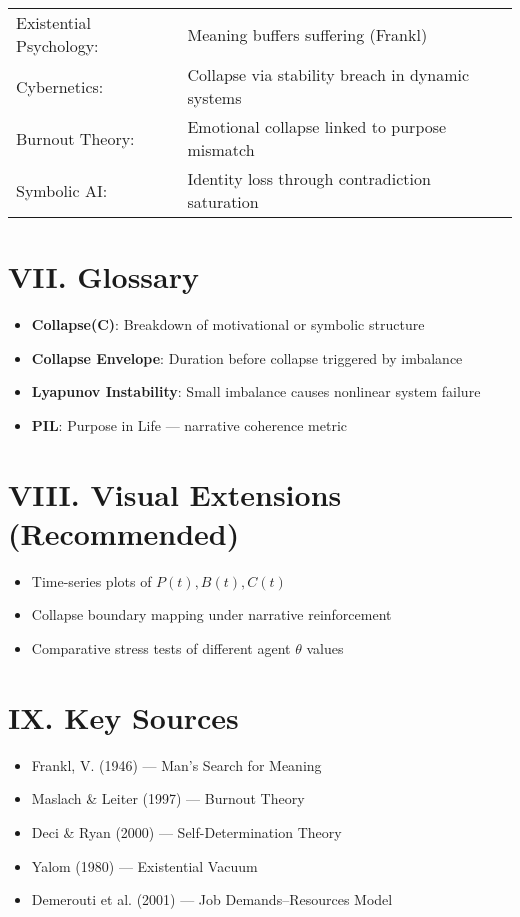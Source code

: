 \documentclass[12pt]{article}
\begin{document}
\begin{tabular}{ll}
Existential Psychology: & Meaning buffers suffering (Frankl) \\
Cybernetics: & Collapse via stability breach in dynamic systems \\
Burnout Theory: & Emotional collapse linked to purpose mismatch \\
Symbolic AI: & Identity loss through contradiction saturation \\
\end{tabular}

\section*{VII. Glossary}

\begin{itemize}
  \item \textbf{Collapse(C)}: Breakdown of motivational or symbolic structure
  \item \textbf{Collapse Envelope}: Duration before collapse triggered by imbalance
  \item \textbf{Lyapunov Instability}: Small imbalance causes nonlinear system failure
  \item \textbf{PIL}: Purpose in Life — narrative coherence metric
\end{itemize}

\section*{VIII. Visual Extensions (Recommended)}

\begin{itemize}
  \item Time-series plots of \( P(t), B(t), C(t) \)
  \item Collapse boundary mapping under narrative reinforcement
  \item Comparative stress tests of different agent \( \theta \) values
\end{itemize}

\section*{IX. Key Sources}

\begin{itemize}
  \item Frankl, V. (1946) — Man’s Search for Meaning
  \item Maslach & Leiter (1997) — Burnout Theory
  \item Deci & Ryan (2000) — Self-Determination Theory
  \item Yalom (1980) — Existential Vacuum
  \item Demerouti et al. (2001) — Job Demands–Resources Model
\end{itemize}
\end{document}

